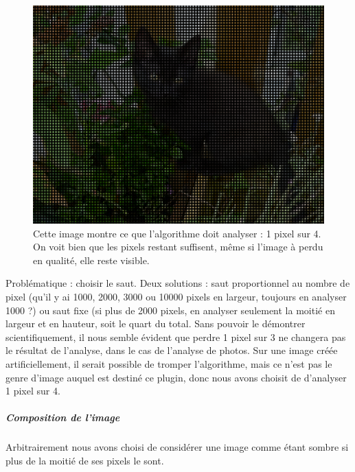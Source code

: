 				\begin{figure}[!htbp]
				  \centering
				  \includegraphics[scale=0.50]{img/gala_v2}
				  \caption{Cette image montre ce que l'algorithme doit analyser : 1 pixel sur 4. On voit bien que les pixels restant suffisent, même si l'image à perdu en qualité, elle reste visible.}
				  \label{fig:chatonApresAnalyse}
				\end{figure}

				Problématique : choisir le saut. Deux solutions : saut proportionnel au nombre de pixel (qu'il y ai 1000, 2000, 3000 ou 10000 pixels en largeur, toujours en analyser 1000 ?) ou saut fixe (si plus de 2000 pixels, en analyser seulement la moitié en largeur et en hauteur, soit le quart du total.
				Sans pouvoir le démontrer scientifiquement, il nous semble évident que perdre 1 pixel sur 3 ne changera pas le résultat de l'analyse, dans le cas de l'analyse de photos. Sur une image créée artificiellement, il serait possible de tromper l'algorithme, mais ce n'est pas le genre d'image auquel est destiné ce plugin, donc nous avons choisit de d'analyser 1 pixel sur 4.
				
			\subparagraph{Composition de l'image}
					Arbitrairement nous avons choisi de considérer une image comme étant sombre si plus de la moitié de ses pixels le sont.
					
